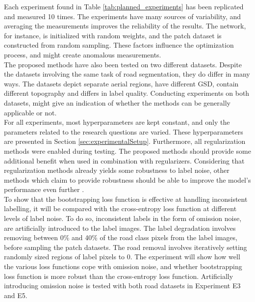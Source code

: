 Each experiment found in Table \ref{tab:planned_experiments} has been replicated and measured 10 times. The experiments have many sources of variability, and averaging the measurements improves the reliability of the results. The network, for instance, is initialized with random weights, and the patch dataset is constructed from random sampling. These factors influence the optimization process, and might create anomalous measurements.\\

The proposed methods have also been tested on two different datasets. Despite the datasets involving the same task of road segmentation, they do differ in many ways. The datasets depict separate aerial regions, have different \ac{GSD}, contain different topography and differs in label quality. Conducting experiments on both datasets, might give an indication of whether the methods can be generally applicable or not.\\

For all experiments, most hyperparameters are kept constant, and only the parameters related to the research questions are varied. These hyperparameters are presented in Section \ref{sec:experimentalSetup}. Furthermore, all regularization methods were enabled during testing. The proposed methods should provide some additional benefit when used in combination with regularizers. Considering that regularization methods already yields some robustness to label noise, other methods which claim to provide robustness should be able to improve the model's performance even further .  \\

To show that the bootstrapping loss function is effective at handling inconsistent labelling, it will be compared with the cross-entropy loss function at different levels of label noise. To do so, inconsistent labels in the form of omission noise, are artificially introduced to the label images. The label degradation involves removing between 0\% and 40\% of the road class pixels from the label images, before sampling the patch datasets. The road removal involves iteratively setting randomly sized regions of label pixels to 0. The experiment will show how well the various loss functions cope with omission noise, and whether bootstrapping loss function is more robust than the cross-entropy loss function. Artificially introducing omission noise is tested with both road datasets in Experiment E3 and E5.\\

